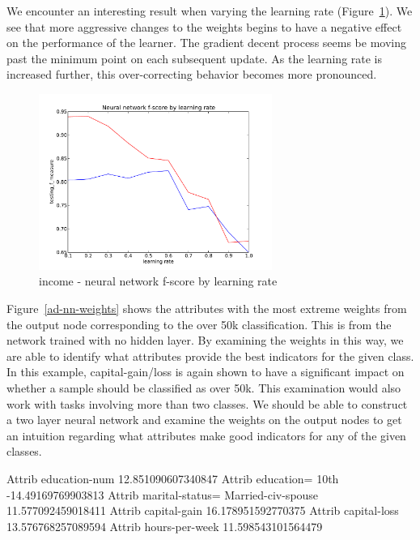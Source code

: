 \documentclass{sig-alternate}
\begin{document}
We encounter an interesting result when varying the learning rate (Figure~\ref{ad-nn-lr}). We see that more aggressive changes to the weights begins to have a negative effect on the performance of the learner. The gradient decent process seems be moving past the minimum point on each subsequent update. As the learning rate is increased further, this over-correcting behavior becomes more pronounced.


\begin{figure}[!htbp]
    \centering
    \includegraphics[width=3in]{data/adult/perceptron/learning-rate.pdf}
    \caption{income - neural network f-score by learning rate \label{ad-nn-lr}}
\end{figure} 


Figure~\ref{ad-nn-weights} shows the attributes with the most extreme weights from the output node corresponding to the over 50k classification. This is from the network trained with no hidden layer. By examining the weights in this way, we are able to identify what attributes provide the best indicators for the given class. In this example, capital-gain/loss is again shown to have a significant impact on whether a sample should be classified as over 50k. This examination would also work with tasks involving more than two classes. We should be able to construct a two layer neural network and examine the weights on the output nodes to get an intuition regarding what attributes make good indicators for any of the given classes.


\scriptsize
\begin{verbbox}
    Attrib education-num                         12.851090607340847
    Attrib education= 10th                       -14.49169769903813
    Attrib marital-status= Married-civ-spouse    11.577092459018411
    Attrib capital-gain                          16.178951592770375
    Attrib capital-loss                          13.576768257089594
    Attrib hours-per-week                        11.598543101564479
\end{verbbox}
\normalsize
\end{document}

